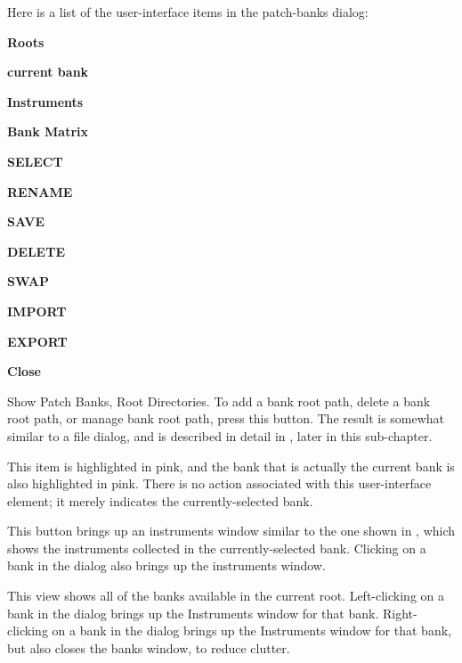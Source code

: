    Here is a list of the user-interface items in the patch-banks dialog:

   \begin{enumber}
      \item \textbf{Roots}
      \item \textbf{current bank}
      \item \textbf{Instruments}
      \item \textbf{Bank Matrix}
      \item \textbf{SELECT}
      \item \textbf{RENAME}
      \item \textbf{SAVE}
      \item \textbf{DELETE}
      \item \textbf{SWAP}
      \item \textbf{IMPORT}
      \item \textbf{EXPORT}
      \item \textbf{Close}
   \end{enumber}

   \setcounter{ItemCounter}{0}      %

   Show Patch Banks, Root Directories.
   To add a bank root path, delete a bank root path, or manage bank root path,
   press this button.  The result is somewhat similar to a file dialog,
   and is described in detail in
   , later in
   this sub-chapter.

   This item is highlighted in pink, and the bank that is actually the current
   bank is also highlighted in pink.  There is no action associated with this
   user-interface element; it merely indicates the currently-selected bank.

   This button brings up an instruments window similar
   to the one shown in
   , which shows
   the instruments collected in the currently-selected bank.
   Clicking on a bank in the dialog also brings up the instruments window.

   This view shows all of the banks available in the current root.
   Left-clicking on a bank in the dialog brings up the Instruments window for
   that bank.
   Right-clicking on a bank in the dialog brings up the Instruments window for
   that bank, but also closes the banks window, to reduce clutter.

